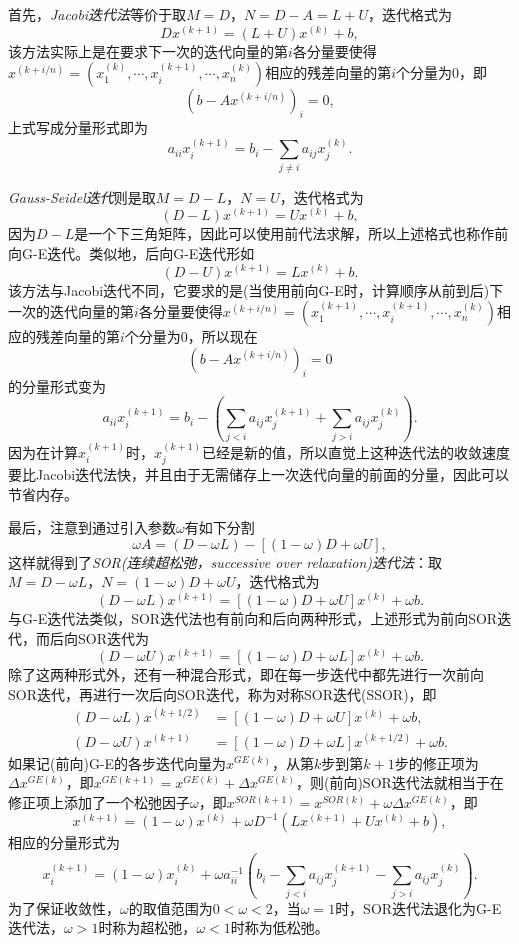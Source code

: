 \documentclass[a4paper,10pt]{ctexart}
\begin{document}
首先，\emph{Jacobi迭代法}等价于取$ M=D $，$ N=D-A=L+U $，迭代格式为
\[
    Dx^{(k+1)} = (L+U)x^{(k)} + b,
\]
该方法实际上是在要求下一次的迭代向量的第$ i $各分量要使得$ x^{(k+i / n)}=(x^{(k)}_1,\cdots , x^{(k+1)}_i,\cdots ,x^{(k)}_n) $相应的残差向量的第$ i $个分量为0，即
\[
    (b - Ax^{(k+i / n)})_i = 0,
\]
上式写成分量形式即为
\[
    a_{ii} x^{(k+1)}_i = b_i - \sum_{j\neq i} a_{ij}x^{(k)}_j.
\]

\emph{Gauss-Seidel迭代}则是取$ M=D-L $，$ N=U $，迭代格式为
\[
    (D-L)x^{(k+1)} = Ux^{(k)} + b,
\]
因为$ D-L $是一个下三角矩阵，因此可以使用前代法求解，所以上述格式也称作前向G-E迭代。类似地，后向G-E迭代形如
\[
    (D-U)x^{(k+1)} = Lx^{(k)} + b.
\]
该方法与Jacobi迭代不同，它要求的是(当使用前向G-E时，计算顺序从前到后)下一次的迭代向量的第$ i $各分量要使得$ x^{(k+i / n)}=(x^{(k+1)}_1,\cdots , x^{(k+1)}_i,\cdots ,x^{(k)}_n) $相应的残差向量的第$ i $个分量为0，所以现在
\[
    (b - Ax^{(k+i / n)})_i = 0
\]
的分量形式变为
\[
    a_{ii} x^{(k+1)}_i = b_i - \left( \sum_{j<i} a_{ij}x^{(k+1)}_j + \sum_{j>i} a_{ij}x^{(k)}_j \right) .
\]
因为在计算$ x^{(k+1)}_i $时，$ x^{(k+1)}_j $已经是新的值，所以直觉上这种迭代法的收敛速度要比Jacobi迭代法快，并且由于无需储存上一次迭代向量的前面的分量，因此可以节省内存。

最后，注意到通过引入参数$ \omega $有如下分割
\[
    \omega A = (D - \omega L) - [(1-\omega)D + \omega U],
\]
这样就得到了\emph{SOR(连续超松弛，successive over relaxation)迭代法}：取$ M=D-\omega L $，$ N=(1-\omega)D + \omega U $，迭代格式为
\[
    (D-\omega L)x^{(k+1)} = [(1-\omega)D + \omega U]x^{(k)} + \omega b.
\]
与G-E迭代法类似，SOR迭代法也有前向和后向两种形式，上述形式为前向SOR迭代，而后向SOR迭代为
\[
    (D-\omega U)x^{(k+1)} = [(1-\omega)D + \omega L]x^{(k)} + \omega b.
\]
除了这两种形式外，还有一种混合形式，即在每一步迭代中都先进行一次前向SOR迭代，再进行一次后向SOR迭代，称为对称SOR迭代(SSOR)，即
\[
    \begin{aligned}
        (D-\omega L)x^{(k+1/2)} &= [(1-\omega)D + \omega U]x^{(k)} + \omega b,\\
        (D-\omega U)x^{(k+1)} &= [(1-\omega)D + \omega L]x^{(k+1/2)} + \omega b.
    \end{aligned}
\]
如果记(前向)G-E的各步迭代向量为$ x^{GE(k)} $，从第$ k $步到第$ k+1 $步的修正项为$ \Delta x^{GE(k)} $，即$ x^{GE(k+1)} = x^{GE(k)} + \Delta x^{GE(k)} $，则(前向)SOR迭代法就相当于在修正项上添加了一个松弛因子$ \omega $，即$ x^{SOR(k+1)} = x^{SOR(k)} + \omega \Delta x^{GE(k)} $，即
\[
    x^{(k+1)} = (1-\omega)x^{(k)} + \omega D^{-1}(L x^{(k+1)} +U x^{(k)} + b),
\]
相应的分量形式为
\[
    x^{(k+1)}_i = (1-\omega)x^{(k)}_i + \omega a_{ii}^{-1} \left(b_i - \sum_{j<i} a_{ij}x^{(k+1)}_j - \sum_{j>i} a_{ij}x^{(k)}_j \right).
\]
为了保证收敛性，$ \omega $的取值范围为$ 0<\omega<2 $，当$ \omega=1 $时，SOR迭代法退化为G-E迭代法，$ \omega>1 $时称为超松弛，$ \omega<1 $时称为低松弛。
\end{document}
